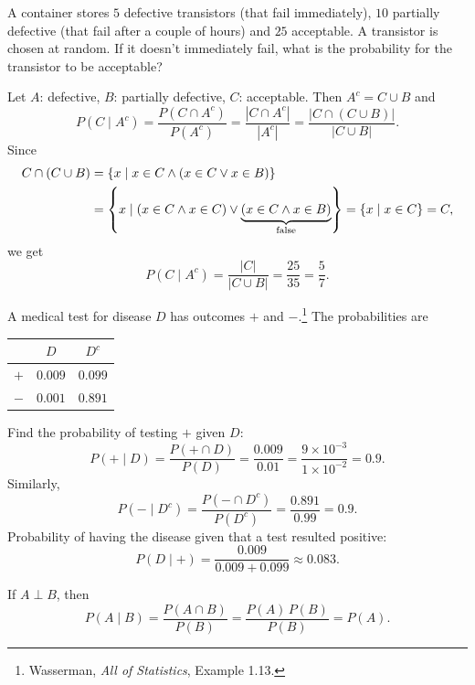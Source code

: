 \begin{example}
A container stores $5$ defective transistors (that fail immediately), $10$ partially defective (that fail after a couple of hours) and $25$ acceptable. A transistor is chosen at random. If it doesn't immediately fail, what is the probability for the transistor to be acceptable?

Let $A$: defective, $B$: partially defective, $C$: acceptable. Then $A^c = C \cup B$ and
\[
P(C \mid A^c) = \frac{P(C \cap A^c)}{P(A^c)} = \frac{|C \cap A^c|}{|A^c|} = \frac{|C \cap (C \cup B)|}{|C \cup B|}.
\]
Since
\begin{align*}
C \cap (C \cup B) &= \left\{x \mid x \in C \wedge (x \in C \vee x \in B)\right\}\\
&= \left\{x \mid (x \in C \wedge x \in C) \vee \underbrace{(x \in C \wedge x \in B)}_{\text{false}}\right\} = \left\{x \mid x \in C\right\} = C,
\end{align*}
we get
\[
P(C \mid A^c) = \frac{|C|}{|C \cup B|} = \frac{25}{35} = \frac57.
\]
\end{example}

\begin{example}
A medical test for disease $D$ has outcomes $+$ and $-$.\footnote{Wasserman, \emph{All of Statistics}, Example 1.13.} The probabilities are
\begin{center}
\begin{tabular}{c|cc}
 & $D$ & $D^c$\\ \hline
$+$ & $0.009$ & $0.099$\\
$-$ & $0.001$ & $0.891$
\end{tabular}
\end{center}
Find the probability of testing $+$ given $D$:
\[
P(+ \mid D) = \frac{P(+ \cap D)}{P(D)} = \frac{0.009}{0.01} = \frac{9\times10^{-3}}{1\times10^{-2}} = 0.9.
\]
Similarly,
\[
P(- \mid D^c) = \frac{P(- \cap D^c)}{P(D^c)} = \frac{0.891}{0.99} = 0.9.
\]
Probability of having the disease given that a test resulted positive:
\[
P(D \mid +) = \frac{0.009}{0.009 + 0.099} \approx 0.083.
\]
\end{example}

If $A \perp B$, then
\[
P(A \mid B) = \frac{P(A \cap B)}{P(B)} = \frac{P(A)\,P(B)}{P(B)} = P(A).
\]

